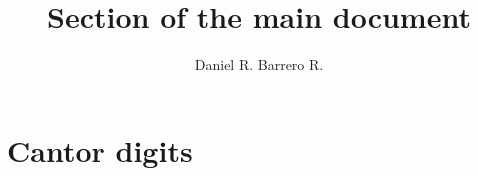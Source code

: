\documentclass{amsart}
\title{Section of the main document}
\author{Daniel R. Barrero R.}
\begin{document}
\maketitle

\section{Cantor digits}


%


\end{document}
